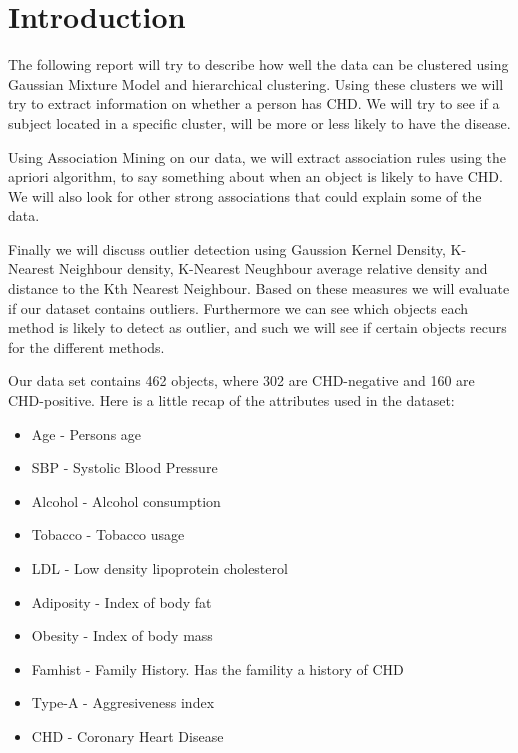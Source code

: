 \section{Introduction}
The following report will try to describe how well the data can be clustered using Gaussian Mixture Model and hierarchical clustering. Using these clusters we will try to extract information on whether a person has CHD. We will try to see if a subject located in a specific cluster, will be more or less likely to have the disease.

Using Association Mining on our data, we will extract association rules using the apriori algorithm, to say something about when an object is likely to have CHD. We will also look for other strong associations that could explain some of the data.

Finally we will discuss outlier detection using Gaussion Kernel Density, K-Nearest Neighbour density, K-Nearest Neughbour average relative density and distance to the Kth Nearest Neighbour. Based on these measures we will evaluate if our dataset contains outliers. Furthermore we can see which objects each method is likely to detect as outlier, and such we will see if certain objects recurs for the different methods.

Our data set contains 462 objects, where 302 are CHD-negative and 160 are CHD-positive. Here is a little recap of the attributes used in the dataset:
\begin{itemize}
\item Age - Persons age
\item SBP - Systolic Blood Pressure
\item Alcohol - Alcohol consumption
\item Tobacco - Tobacco usage
\item LDL - Low density lipoprotein cholesterol
\item Adiposity - Index of body fat
\item Obesity - Index of body mass
\item Famhist - Family History. Has the famility a history of CHD
\item Type-A - Aggresiveness index
\item CHD - Coronary Heart Disease
\end{itemize}
